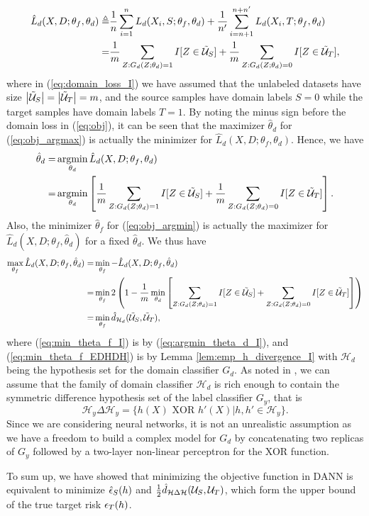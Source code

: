 \begin{align}
\hat{L}_{d}(X, D; \theta_f, \theta_d) \triangleq &
\frac{1}{n} \sum_{i=1}^{n} L_d(X_i, S; \theta_f, \theta_d)
+
\frac{1}{n'} \sum_{i=n+1}^{n + n'} L_d(X_i, T; \theta_f, \theta_d) \label{eq:domain_loss}\\
= & \frac{1}{m} \sum_{Z:G_d(Z;\theta_d)=1}I[Z \in \tilde{\mathcal{U}}_S]+\frac{1}{m} \sum_{Z:G_d(Z;\theta_d)=0}I[Z \in \tilde{\mathcal{U}}_T], \label{eq:domain_loss_I}
\end{align}
where in (\ref{eq:domain_loss_I}) we have assumed that the unlabeled datasets have size $\left \lvert \tilde{\mathcal{U}}_S \right \rvert=\left \lvert \tilde{\mathcal{U}}_T \right \rvert=m$, and the source samples have domain labels $S=0$ while the target samples have domain labels $T=1$. By noting the minus sign before the domain loss in (\ref{eq:obj}), it can be seen that the maximizer $\hat{\theta}_d$ for (\ref{eq:obj_argmax}) is actually the minimizer for $\hat{L}_{d}(X, D; \theta_f, \theta_d)$. Hence, we have
\begin{align}
\hat{\theta}_d
= & \mathop{\mathrm{argmin}}_{\theta_d} \hat{L}_{d}(X, D; \theta_f, \theta_d) \label{eq:argmin_theta_d}\\
= & \mathop{\mathrm{argmin}}_{\theta_d} \left[ \frac{1}{m} \sum_{Z:G_d(Z;\theta_d)=1}I[Z \in \tilde{\mathcal{U}}_S]+\frac{1}{m} \sum_{Z:G_d(Z;\theta_d)=0}I[Z \in \tilde{\mathcal{U}}_T] \right]. \label{eq:argmin_theta_d_I}
\end{align}
Also, the minimizer $\hat{\theta}_f$ for (\ref{eq:obj_argmin}) is actually the maximizer for $\hat{L}_{d}(X, D; \theta_f, \hat{\theta}_d)$ for a fixed $\hat{\theta}_d$. We thus have
\begin{align}
\max_{\theta_f}{\hat{L}_{d}(X, D; \theta_f, \hat{\theta}_d)}
=& \min_{\theta_f}{- \hat{L}_{d}(X, D; \theta_f, \hat{\theta}_d)} \label{eq:min_theta_f}\\
=& \min_{\theta_f} 2 \left( 1 - \frac{1}{m} \min_{\theta_d} \left[ \sum_{Z:G_d(Z;\theta_d)=1}I[Z \in \tilde{\mathcal{U}}_S]+ \sum_{Z:G_d(Z;\theta_d)=0}I[Z \in \tilde{\mathcal{U}}_T] \right] \right) \label{eq:min_theta_f_I}\\
=& \min_{\theta_f} \hat{d}_{\mathcal{H}_d}(\tilde{\mathcal{U}}_S, \tilde{\mathcal{U}}_T) \label{eq:min_theta_f_EDHDH},
\end{align}
where (\ref{eq:min_theta_f_I}) is by (\ref{eq:argmin_theta_d_I}), and (\ref{eq:min_theta_f_EDHDH}) is by Lemma \ref{lem:emp_h_divergence_I} with $\mathcal{H}_d$ being the hypothesis set for the domain classifier $G_d$. As noted in \cite{Ganin2015}, we can assume that the family of domain classifier $\mathcal{H}_d$ is rich enough to contain the symmetric difference hypothesis set of the label classifier $G_y$, that is
\begin{equation}
 \mathcal{H}_y \Delta \mathcal{H}_y = \{ h(X) \text{ XOR } h'(X) \vert h, h' \in \mathcal{H}_y \}.
\end{equation}
Since we are considering neural networks, it is not an unrealistic assumption as we have a freedom to build a complex model for $G_d$ by concatenating two replicas of $G_y$ followed by a two-layer non-linear perceptron for the XOR function.

To sum up, we have showed that minimizing the objective function in DANN is equivalent to minimize $\hat{\epsilon}_{S}(h)$ and $\frac{1}{2} \hat{d}_{\mathcal{H} \Delta \mathcal{H}}(\mathcal{U}_S, \mathcal{U}_T)$, which form the upper bound of the true target risk $\epsilon_{T}(h)$.



